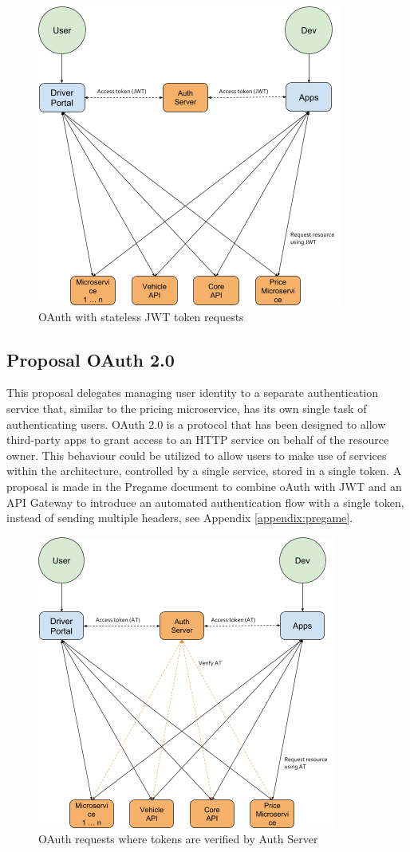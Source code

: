 \begin{figure}[H]
	\centering
	\includegraphics[width=.7\textwidth]{Auth2}
	\caption[Stateless JWT]{OAuth with stateless JWT token requests}
	\label{fig:Auth2}
\end{figure}

\subsection{Proposal OAuth 2.0}
This proposal delegates managing user identity to a separate authentication service that, similar to the pricing microservice, has its own single task of authenticating users. OAuth 2.0 is a protocol that has been designed to allow third-party apps to grant access to an HTTP service on behalf of the resource owner. This behaviour could be utilized to allow users to make use of services within the architecture, controlled by a single service, stored in a single token. A proposal is made in the Pregame document to combine oAuth with JWT and an API Gateway to introduce an automated authentication flow with a single token, instead of sending multiple headers, see Appendix \ref{appendix:pregame}.

\begin{figure}[H]
	\centering
	\includegraphics[width=.7\textwidth]{Auth1}
	\caption[OAuth 2.0]{OAuth requests where tokens are verified by Auth Server}
	\label{fig:Auth1}
\end{figure}

